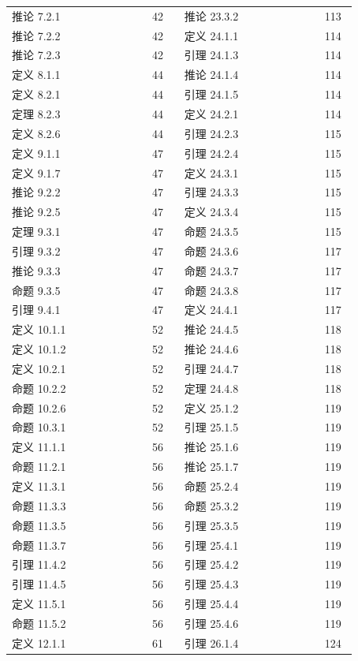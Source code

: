 \documentclass[UTF8,10pt,fontset=windows]{ctexart}
\begin{document}
{\begin{longtable}{@{}p{0.355\linewidth}p{0.085\linewidth}p{0.355\linewidth}p{0.085\linewidth}@{}}
推论 7.2.1 & 42 & 推论 23.3.2 & 113 \\
推论 7.2.2 & 42 & 定义 24.1.1 & 114 \\
推论 7.2.3 & 42 & 引理 24.1.3 & 114 \\
定义 8.1.1 & 44 & 推论 24.1.4 & 114 \\
定义 8.2.1 & 44 & 引理 24.1.5 & 114 \\
定理 8.2.3 & 44 & 定义 24.2.1 & 114 \\
定义 8.2.6 & 44 & 引理 24.2.3 & 115 \\
定义 9.1.1 & 47 & 引理 24.2.4 & 115 \\
定义 9.1.7 & 47 & 定义 24.3.1 & 115 \\
推论 9.2.2 & 47 & 引理 24.3.3 & 115 \\
推论 9.2.5 & 47 & 定义 24.3.4 & 115 \\
定理 9.3.1 & 47 & 命题 24.3.5 & 115 \\
引理 9.3.2 & 47 & 命题 24.3.6 & 117 \\
推论 9.3.3 & 47 & 命题 24.3.7 & 117 \\
命题 9.3.5 & 47 & 命题 24.3.8 & 117 \\
引理 9.4.1 & 47 & 定义 24.4.1 & 117 \\
定义 10.1.1 & 52 & 推论 24.4.5 & 118 \\
定义 10.1.2 & 52 & 推论 24.4.6 & 118 \\
定义 10.2.1 & 52 & 引理 24.4.7 & 118 \\
命题 10.2.2 & 52 & 定理 24.4.8 & 118 \\
命题 10.2.6 & 52 & 定义 25.1.2 & 119 \\
命题 10.3.1 & 52 & 引理 25.1.5 & 119 \\
定义 11.1.1 & 56 & 推论 25.1.6 & 119 \\
命题 11.2.1 & 56 & 推论 25.1.7 & 119 \\
定义 11.3.1 & 56 & 命题 25.2.4 & 119 \\
命题 11.3.3 & 56 & 命题 25.3.2 & 119 \\
命题 11.3.5 & 56 & 引理 25.3.5 & 119 \\
命题 11.3.7 & 56 & 引理 25.4.1 & 119 \\
引理 11.4.2 & 56 & 引理 25.4.2 & 119 \\
引理 11.4.5 & 56 & 引理 25.4.3 & 119 \\
定义 11.5.1 & 56 & 引理 25.4.4 & 119 \\
命题 11.5.2 & 56 & 引理 25.4.6 & 119 \\
定义 12.1.1 & 61 & 引理 26.1.4 & 124 \\

\end{longtable}}
\end{document}
